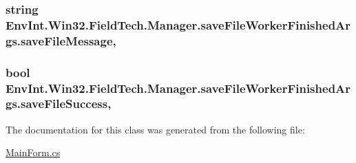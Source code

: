 \subsubsection[{save\+File\+Message}]{\setlength{\rightskip}{0pt plus 5cm}string Env\+Int.\+Win32.\+Field\+Tech.\+Manager.\+save\+File\+Worker\+Finished\+Args.\+save\+File\+Message\hspace{0.3cm}{\ttfamily [get]}, {\ttfamily [set]}}\label{class_env_int_1_1_win32_1_1_field_tech_1_1_manager_1_1save_file_worker_finished_args_af0c433cc77cfaee8e4c58687e70869e5}
\hypertarget{class_env_int_1_1_win32_1_1_field_tech_1_1_manager_1_1save_file_worker_finished_args_ade86526171d5c37ef07dfd25e9667f2e}{}
\subsubsection[{save\+File\+Success}]{\setlength{\rightskip}{0pt plus 5cm}bool Env\+Int.\+Win32.\+Field\+Tech.\+Manager.\+save\+File\+Worker\+Finished\+Args.\+save\+File\+Success\hspace{0.3cm}{\ttfamily [get]}, {\ttfamily [set]}}\label{class_env_int_1_1_win32_1_1_field_tech_1_1_manager_1_1save_file_worker_finished_args_ade86526171d5c37ef07dfd25e9667f2e}


The documentation for this class was generated from the following file\+:\begin{DoxyCompactItemize}
\item 
\hyperlink{_main_form_8cs}{Main\+Form.\+cs}\end{DoxyCompactItemize}
